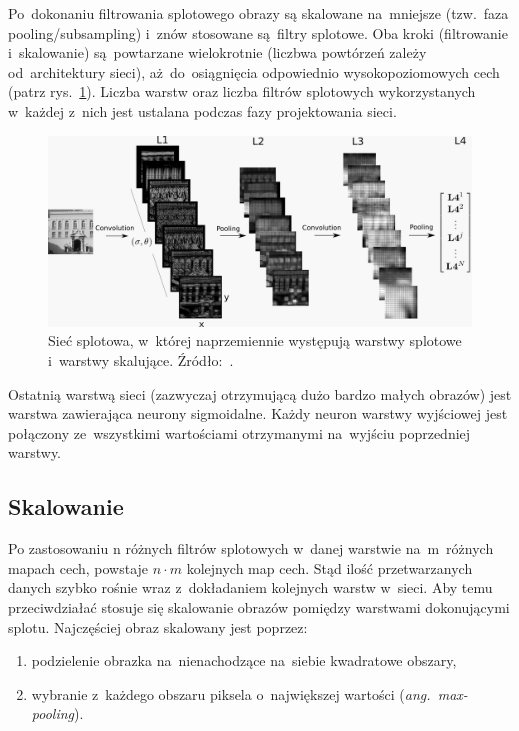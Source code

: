 Po~dokonaniu filtrowania splotowego obrazy są skalowane na~mniejsze (tzw.~faza pooling/subsampling) i~znów
stosowane są~filtry splotowe. Oba kroki (filtrowanie i~skalowanie) są~powtarzane wielokrotnie
(liczbwa powtórzeń zależy od~architektury sieci), aż~do~osiągnięcia odpowiednio wysokopoziomowych cech (patrz
rys.~\ref{rys:convnet-illustration}). Liczba warstw oraz liczba filtrów splotowych wykorzystanych w~każdej z~nich jest
ustalana podczas fazy projektowania sieci.

\begin{figure}[H]
	\centering
	\includegraphics[width=\linewidth]{img/convnet.png}
	\caption{Sieć splotowa, w~której naprzemiennie występują warstwy splotowe i~warstwy skalujące.
	Źródło:~\cite{convnet-illustration}.}
	\label{rys:convnet-illustration}
\end{figure}

Ostatnią warstwą sieci (zazwyczaj otrzymującą dużo bardzo małych obrazów) jest warstwa zawierająca neurony
sigmoidalne. Każdy neuron warstwy wyjściowej jest połączony ze~wszystkimi wartościami otrzymanymi na~wyjściu
poprzedniej warstwy.

\subsection{Skalowanie}
Po zastosowaniu n różnych filtrów splotowych w~danej warstwie na~m~różnych mapach cech, powstaje $n\cdot m$
kolejnych map cech. Stąd ilość przetwarzanych danych szybko rośnie wraz z~dokładaniem kolejnych warstw
w~sieci. Aby temu przeciwdziałać stosuje się skalowanie obrazów pomiędzy warstwami dokonującymi splotu.
Najczęściej obraz skalowany jest poprzez:
\begin{enumerate}
  \item podzielenie obrazka na~nienachodzące na~siebie kwadratowe obszary,
  \item wybranie z~każdego obszaru piksela o~największej wartości (\textit{ang.~max-pooling}).
\end{enumerate}

